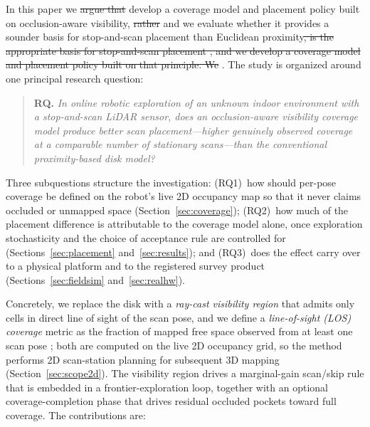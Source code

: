 \documentclass[sensors,article,submit,pdftex,moreauthors]{Definitions/mdpi}
\providecommand{\DIFadd}[1]{{\protect\color{blue} \sf #1}} %
\providecommand{\DIFdel}[1]{{\protect\color{red}\protect\scriptsize\protect\sout{#1}}} %
\providecommand{\DIFaddbegin}{} %
\providecommand{\DIFaddend}{} %
\providecommand{\DIFdelbegin}{} %
\providecommand{\DIFdelend}{} %
\begin{document}
In this paper we \DIFdelbegin \DIFdel{argue that }\DIFdelend \DIFaddbegin \DIFadd{develop a coverage model and placement policy built on
}\DIFaddend occlusion-aware visibility, \DIFdelbegin \DIFdel{rather }\DIFdelend \DIFaddbegin \DIFadd{and we evaluate whether it provides a sounder basis
for stop-and-scan placement }\DIFaddend than Euclidean proximity\DIFdelbegin \DIFdel{, is the appropriate basis for stop-and-scan placement , and we develop
a coverage model and placement policy built on that principle.
We }\DIFdelend \DIFaddbegin \DIFadd{. The study is organized
around one principal research question:
}\begin{quote}
\DIFadd{\textbf{RQ.} \emph{In online robotic exploration of an unknown indoor
environment with a stop-and-scan LiDAR sensor, does an occlusion-aware
visibility coverage model produce better scan placement---higher genuinely
observed coverage at a comparable number of stationary scans---than the
conventional proximity-based disk model?}
}\end{quote}
\DIFadd{Three subquestions structure the investigation: (RQ1)~how should per-pose
coverage be defined on the robot's live 2D occupancy map so that it never
claims occluded or unmapped space (Section~\ref{sec:coverage}); (RQ2)~how much
of the placement difference is attributable to the coverage model alone, once
exploration stochasticity and the choice of acceptance rule are controlled for
(Sections~\ref{sec:placement} and~\ref{sec:results}); and (RQ3)~does the
effect carry over to a physical platform and to the registered survey product
(Sections~\ref{sec:fieldsim} and~\ref{sec:realhw}).
}

\DIFadd{Concretely, we }\DIFaddend replace the
disk with a \emph{ray-cast visibility region} that admits only cells in direct
line of sight of the scan pose, and we define a \emph{line-of-sight (LOS)
coverage} metric as the fraction of mapped free space observed from at least one
scan pose\DIFaddbegin \DIFadd{; both are computed on the live 2D occupancy grid, so the method
performs 2D scan-station planning for subsequent 3D mapping
(Section~\ref{sec:scope2d})}\DIFaddend . The visibility region drives a marginal-gain scan/skip rule that is
embedded in a frontier-exploration loop, together with an optional
coverage-completion phase that drives residual occluded pockets toward full
coverage. The contributions are:
\end{document}
